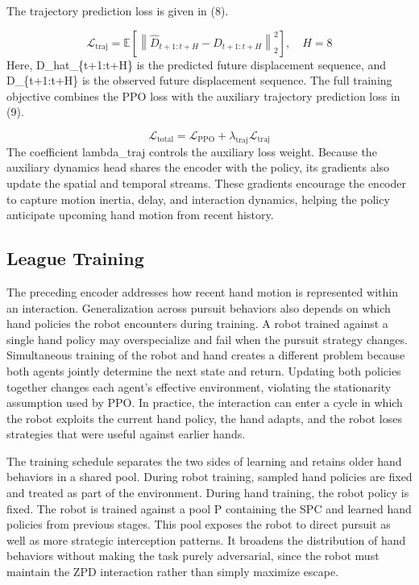 \documentclass[letterpaper,journal]{IEEEtran}
\begin{document}
The trajectory prediction loss is given in (8).

\begin{equation}
\mathcal{L}_{\mathrm{traj}} = \mathbb{E}\!\left[\left\|\widehat{D}_{t+1:t+H}-D_{t+1:t+H}\right\|_2^2\right],\quad H=8
\end{equation}
Here, D\_hat\_\{t+1:t+H\} is the predicted future displacement sequence, and D\_\{t+1:t+H\} is the observed future displacement sequence. The full training objective combines the PPO loss with the auxiliary trajectory prediction loss in (9).

\begin{equation}
\mathcal{L}_{\mathrm{total}} = \mathcal{L}_{\mathrm{PPO}} + \lambda_{\mathrm{traj}}\mathcal{L}_{\mathrm{traj}}
\end{equation}
The coefficient lambda\_traj controls the auxiliary loss weight. Because the auxiliary dynamics head shares the encoder with the policy, its gradients also update the spatial and temporal streams. These gradients encourage the encoder to capture motion inertia, delay, and interaction dynamics, helping the policy anticipate upcoming hand motion from recent history.

\subsection{League Training}
The preceding encoder addresses how recent hand motion is represented within an interaction. Generalization across pursuit behaviors also depends on which hand policies the robot encounters during training. A robot trained against a single hand policy may overspecialize and fail when the pursuit strategy changes. Simultaneous training of the robot and hand creates a different problem because both agents jointly determine the next state and return. Updating both policies together changes each agent's effective environment, violating the stationarity assumption used by PPO. In practice, the interaction can enter a cycle in which the robot exploits the current hand policy, the hand adapts, and the robot loses strategies that were useful against earlier hands.

The training schedule separates the two sides of learning and retains older hand behaviors in a shared pool. During robot training, sampled hand policies are fixed and treated as part of the environment. During hand training, the robot policy is fixed. The robot is trained against a pool P containing the SPC and learned hand policies from previous stages. This pool exposes the robot to direct pursuit as well as more strategic interception patterns. It broadens the distribution of hand behaviors without making the task purely adversarial, since the robot must maintain the ZPD interaction rather than simply maximize escape.
\end{document}
